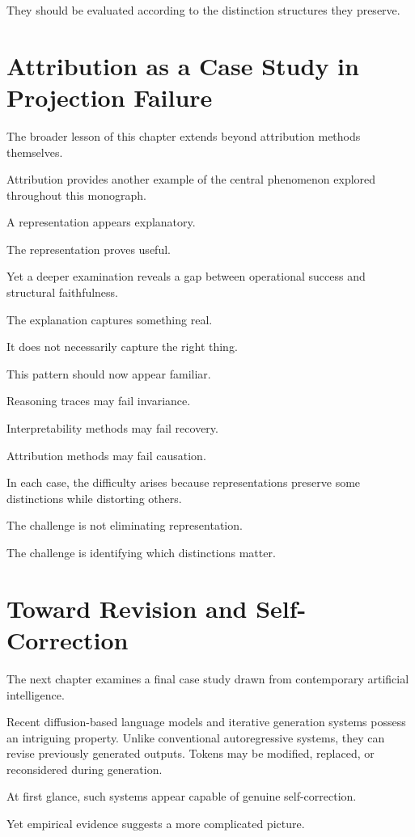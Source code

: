 \documentclass[11pt,oneside,openany]{book}
\begin{document}
They should be evaluated according to the distinction structures they preserve.

\section{Attribution as a Case Study in Projection Failure}

The broader lesson of this chapter extends beyond attribution methods themselves.

Attribution provides another example of the central phenomenon explored throughout this monograph.

A representation appears explanatory.

The representation proves useful.

Yet a deeper examination reveals a gap between operational success and structural faithfulness.

The explanation captures something real.

It does not necessarily capture the right thing.

This pattern should now appear familiar.

Reasoning traces may fail invariance.

Interpretability methods may fail recovery.

Attribution methods may fail causation.

In each case, the difficulty arises because representations preserve some distinctions while distorting others.

The challenge is not eliminating representation.

The challenge is identifying which distinctions matter.

\section{Toward Revision and Self-Correction}

The next chapter examines a final case study drawn from contemporary artificial intelligence.

Recent diffusion-based language models and iterative generation systems possess an intriguing property. Unlike conventional autoregressive systems, they can revise previously generated outputs. Tokens may be modified, replaced, or reconsidered during generation.

At first glance, such systems appear capable of genuine self-correction.

Yet empirical evidence suggests a more complicated picture.
\end{document}
